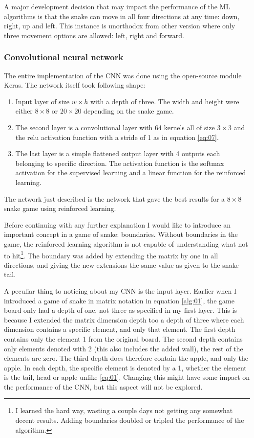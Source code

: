 \documentclass[%
 uio,
 jmp,
 amsmath,amssymb,
 reprint, nofootinbib]{revtex4-1}
\numberwithin{equation}{section}
\begin{document}
A major development decision that may impact the performance of the ML algorithms is that the snake can move in all four directions at any time: down, right, up and left. This instance is unorthodox from other version where only three movement options are allowed: left, right and forward.

\subsubsection{Convolutional neural network}

The entire implementation of the CNN was done using the open-source module Keras. The network itself took following shape:
\begin{enumerate}
\item Input layer of size \(w\times h\) with a depth of three. The width and height were either \(8\times 8\) or \(20\times 20\) depending on the snake game.
\item The second layer is a convolutional layer with 64 kernels all of size \(3\times 3\) and the relu activation function with a stride of 1 as in equation \ref{eq:07}.
\item The last layer is a simple flattened output layer with 4 outputs each belonging to specific direction. The activation function is the softmax activation for the supervised learning and a linear function for the reinforced learning.
\end{enumerate}
The network just described is the network that gave the best results for a \(8\times 8\) snake game using reinforced learning.

Before continuing with any further explanation I would like to introduce an important concept in a game of snake: boundaries. Without boundaries in the game, the reinforced learning algorithm is not capable of understanding what not to hit\footnote{I learned the hard way, wasting a couple days not getting any somewhat decent results. Adding boundaries doubled or tripled the performance of the algorithm.}. The boundary was added by extending the matrix by one in all directions, and giving the new extensions the same value as given to the snake tail.

A peculiar thing to noticing about my CNN is the input layer. Earlier when I introduced a game of snake in matrix notation in equation \ref{alg:01}, the game board only had a depth of one, not three as specified in my first layer. This is because I extended the matrix dimension depth too a depth of three where each dimension contains a specific element, and only that element. The first depth contains only the element 1 from the original board. The second depth contains only elements denoted with 2 (this also includes the added wall), the rest of the elements are zero. The third depth does therefore contain the apple, and only the apple. In each depth, the specific element is denoted by a 1, whether the element is the tail, head or apple unlike \ref{eq:01}. Changing this might have some impact on the performance of the CNN, but this aspect will not be explored.
\end{document}
